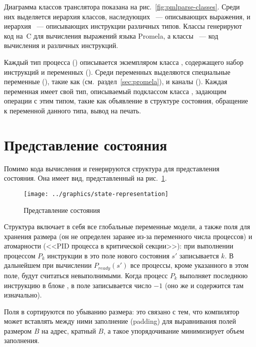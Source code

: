 Диаграмма классов транслятора показана на рис.~\ref{fig:pmlparse-classes}. Среди них
выделяется иерархия классов, наследующих ~--- описывающих выражения, и
иерархия ~--- описывающих инструкции различных типов. Классы
 генерируют код на~C для вычисления выражений языка Promela, а классы
~--- код вычисления  и  различных инструкций.

Каждый тип процесса () описывается экземпляром класса ,
содержащего набор инструкций и переменных (). Среди переменных выделяются
специальные переменные (), такие как 
(см.~раздел~\ref{sec:promela}), и каналы (). Каждая переменная имеет свой
тип, описываемый подклассом класса , задающим операции с этим типом, такие как
объявление в структуре состояния, обращение к переменной данного типа, вывод на
печать\etc.

\section{Представление состояния}
\label{sec:state-represent}

Помимо кода вычисления  и  генерируются структура 
для представления состояния. Она имеет вид, представленный на рис.~\ref{fig:state-repr}.

\begin{figure}[ht]
  \centering
  \texttt{[image: ../graphics/state-representation]}  
  \caption{Представление состояния}
  \label{fig:state-repr}
\end{figure}

Структура  включает в себя все глобальные переменные модели, а также поля для
хранения размера (он не определен заранее из-за переменного числа процессов) и атомарности
(<<PID процесса в критической секции>>): при выполнении процессом $P_k$ инструкции
 в это поле нового состояния $s'$ записывается $k$. В дальнейшем при
вычислении $P_{ready}(s')$ все процессы, кроме указанного в этом поле, будут считаться
невыполнимыми. Когда процесс $P_k$ выполняет последнюю инструкцию в блоке , в
поле записывается число $-1$ (оно же и содержится там изначально).

Поля в  сортируются по убыванию размера: это связано с тем, что компилятор
может вставлять между ними заполнение (padding) для выравнивания полей размером $B$ на
адрес, кратный $B$, а такое упорядочивание минимизирует объем заполнения.

